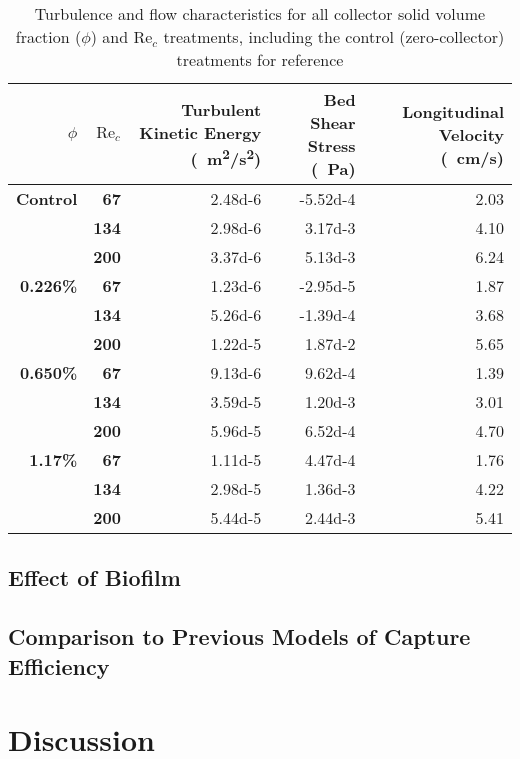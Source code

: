 \documentclass[geosciences,article,submit,moreauthors,pdftex]{Definitions/mdpi}
\newcommand\Rey{\mathrm{Re}}
\begin{document}
\begin{table}[H]
\caption{Turbulence and flow characteristics for all collector solid volume fraction ($\phi$) and $\Rey_c$ treatments, including the control (zero-collector) treatments for reference}
\centering
\begin{tabular}{>{\bfseries}r>{\bfseries}rrrr}
\toprule
\textbf{$\phi$}&\textbf{$\Rey_c$}&\textbf{Turbulent Kinetic Energy (\SI{}{\metre^2/\second^2})}&\textbf{Bed Shear Stress (\SI{}{\pascal})}&\textbf{Longitudinal Velocity (\SI{}{\centi\metre/\second})}\\
\midrule
Control &   67  & \num{2.48d-6}&\num{-5.52d-4}&   2.03\\
        &   134 & \num{2.98d-6}&\num{ 3.17d-3}&   4.10\\
        &   200 & \num{3.37d-6}&\num{ 5.13d-3}&   6.24\\
\midrule
0.226\% &   67  & \num{1.23d-6}&\num{-2.95d-5}&   1.87\\
        &   134 & \num{5.26d-6}&\num{-1.39d-4}&   3.68\\
        &   200 & \num{1.22d-5}&\num{ 1.87d-2}&   5.65\\
\midrule
0.650\% &   67  & \num{9.13d-6}&\num{ 9.62d-4}&   1.39\\
        &   134 & \num{3.59d-5}&\num{ 1.20d-3}&   3.01\\
        &   200 & \num{5.96d-5}&\num{ 6.52d-4}&   4.70\\
\midrule
1.17\%  &   67  & \num{1.11d-5}&\num{ 4.47d-4}&   1.76\\
        &   134 & \num{2.98d-5}&\num{ 1.36d-3}&   4.22\\
        &   200 & \num{5.44d-5}&\num{ 2.44d-3}&   5.41\\
\bottomrule
\end{tabular}
\end{table}


\subsection{Effect of Biofilm}

\subsection{Comparison to Previous Models of Capture Efficiency}

\section{Discussion}
\end{document}
